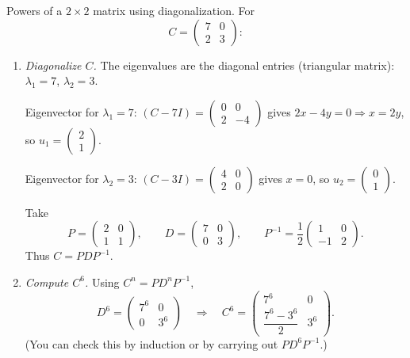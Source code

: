 \documentclass[11pt]{article}
\def\textbf#1{#1}%
\def\mathbf#1{#1}%
\begin{document}
\begin{solution}
\textbf{Powers of a $2\times 2$ matrix using diagonalization.} For
\[
C=\begin{pmatrix}7&0\\[2pt]2&3\end{pmatrix}:
\]
\begin{enumerate}
\item \emph{Diagonalize $C$.} The eigenvalues are the diagonal entries (triangular matrix): $\lambda_1=7$, $\lambda_2=3$.

Eigenvector for $\lambda_1=7$: $(C-7I)=\begin{pmatrix}0&0\\[2pt]2&-4\end{pmatrix}$ gives $2x-4y=0\Rightarrow x=2y$,
so $\mathbf{u}_1=\begin{pmatrix}2\\[2pt]1\end{pmatrix}$.

Eigenvector for $\lambda_2=3$: $(C-3I)=\begin{pmatrix}4&0\\[2pt]2&0\end{pmatrix}$ gives $x=0$,
so $\mathbf{u}_2=\begin{pmatrix}0\\[2pt]1\end{pmatrix}$.

Take
\[
P=\begin{pmatrix}2&0\\[2pt]1&1\end{pmatrix},\qquad
D=\begin{pmatrix}7&0\\[2pt]0&3\end{pmatrix},\qquad
P^{-1}=\frac1{2}\begin{pmatrix}1&0\\[2pt]-1&2\end{pmatrix}.
\]
Thus $C=PDP^{-1}$.

\item \emph{Compute $C^6$.} Using $C^n=P D^n P^{-1}$,
\[
D^6=\begin{pmatrix}7^6&0\\[2pt]0&3^6\end{pmatrix}
\quad\Rightarrow\quad
C^6
= \begin{pmatrix}7^6&0\\[2pt]\dfrac{7^6-3^6}{2}&3^6\end{pmatrix}.
\]
(You can check this by induction or by carrying out $P D^6 P^{-1}$.)
\end{enumerate}
\end{solution}
\end{document}
